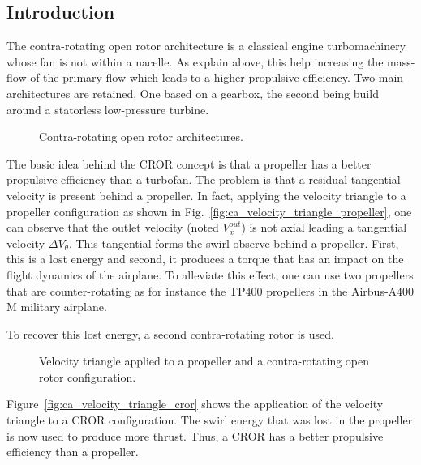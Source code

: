 
\subsection{Introduction}
\label{sub:ca_introduction}

The contra-rotating open rotor architecture is a classical engine
turbomachinery whose fan is not within a nacelle. As explain
above, this help increasing the mass-flow of the primary flow
which leads to a higher propulsive efficiency.
Two main architectures are retained. One based on a gearbox, the second
being build around a statorless low-pressure turbine.
\begin{figure}[htb]
  \centering
  \caption{Contra-rotating open rotor architectures.}
  \label{fig:ca_cror_designs}
\end{figure}

The basic idea behind the CROR concept is that a propeller has a 
better propulsive efficiency than a turbofan. The problem is that
a residual tangential velocity is present behind a propeller.
In fact, applying the velocity triangle to a propeller configuration
as shown in Fig.~\ref{fig:ca_velocity_triangle_propeller}, one can
observe that the outlet velocity (noted $V^{out}_x$) is not axial
leading a tangential velocity $\Delta V_{\theta}$. This tangential forms
the swirl observe behind a propeller. First, this is a lost energy and
second, it produces a torque that has an impact on the flight dynamics
of the airplane. To alleviate this effect, one can use two propellers
that are counter-rotating as for instance the TP$400$ propellers
in the Airbus-A$400$M military airplane.

To recover this lost energy, a second contra-rotating rotor is used.
\begin{figure}[htb]
  \centering
  \caption{Velocity triangle applied to a propeller and a 
  contra-rotating open rotor configuration.}
\end{figure}
Figure~\ref{fig:ca_velocity_triangle_cror} shows the application
of the velocity triangle to a CROR configuration. The swirl
energy that was lost in the propeller is now used to 
produce more thrust. Thus, a CROR has a better propulsive
efficiency than a propeller.

